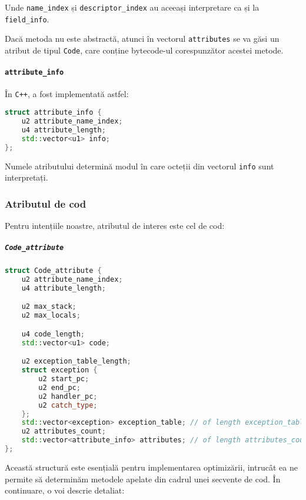 Unde \texttt{name\_index} și \texttt{descriptor\_index} au aceeași
interpretare ca și la \texttt{field\_info}.

Dacă metoda nu este abstractă, atunci în vectorul \texttt{attributes} se
va găsi un atribut de tipul \texttt{Code}, care conține bytecode-ul
corespunzător acestei metode.

\paragraph{\texorpdfstring{\texttt{attribute\_info}}{attribute\_info}}\label{attribute_info}

În \texttt{C++}, a fost implementată astfel:

\begin{lstlisting}[language=C++]
struct attribute_info {
    u2 attribute_name_index;
    u4 attribute_length;
    std::vector<u1> info;
};
\end{lstlisting}

Numele atributului determină modul în care octeții din vectorul
\texttt{info} sunt interpretați.

\subsubsection{Atributul de cod}

Pentru intențiile noastre, atributul de interes este cel de cod:

\subparagraph{\texorpdfstring{\texttt{Code\_attribute}}{Code\_attribute}}\label{code_attribute}

\begin{lstlisting}[language=C++]
struct Code_attribute {
    u2 attribute_name_index;
    u4 attribute_length;

    u2 max_stack;
    u2 max_locals;

    u4 code_length;
    std::vector<u1> code;

    u2 exception_table_length;
    struct exception {
        u2 start_pc;
        u2 end_pc;
        u2 handler_pc;
        u2 catch_type;
    };
    std::vector<exception> exception_table; // of length exception_table_length.
    u2 attributes_count;
    std::vector<attribute_info> attributes; // of length attributes_count.
};
\end{lstlisting}

Această structură este esențială pentru implementarea optimizării,
intrucât ea ne permite să determinăm metodele apelate din cadrul unei secvente de cod.
În continuare, o voi descrie detaliat:

